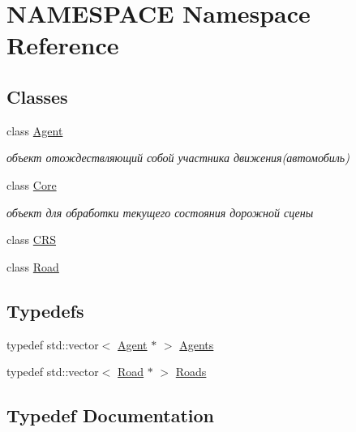 \hypertarget{namespace_n_a_m_e_s_p_a_c_e}{}\section{N\+A\+M\+E\+S\+P\+A\+CE Namespace Reference}
\label{namespace_n_a_m_e_s_p_a_c_e}
\subsection*{Classes}
\begin{DoxyCompactItemize}
\item 
class \hyperlink{class_n_a_m_e_s_p_a_c_e_1_1_agent}{Agent}
\begin{DoxyCompactList}\small\item\em объект отождествляющий собой участника движения(автомобиль) \end{DoxyCompactList}\item 
class \hyperlink{class_n_a_m_e_s_p_a_c_e_1_1_core}{Core}
\begin{DoxyCompactList}\small\item\em объект для обработки текущего состояния дорожной сцены \end{DoxyCompactList}\item 
class \hyperlink{class_n_a_m_e_s_p_a_c_e_1_1_c_r_s}{C\+RS}
\item 
class \hyperlink{class_n_a_m_e_s_p_a_c_e_1_1_road}{Road}
\end{DoxyCompactItemize}
\subsection*{Typedefs}
\begin{DoxyCompactItemize}
\item 
typedef std\+::vector$<$ \hyperlink{class_n_a_m_e_s_p_a_c_e_1_1_agent}{Agent} $\ast$ $>$ \hyperlink{namespace_n_a_m_e_s_p_a_c_e_a610552ba0110b3ee573bc9f3a7a8eac4}{Agents}
\item 
typedef std\+::vector$<$ \hyperlink{class_n_a_m_e_s_p_a_c_e_1_1_road}{Road} $\ast$ $>$ \hyperlink{namespace_n_a_m_e_s_p_a_c_e_a2ec739fb2e81dc98134428bb29817671}{Roads}
\end{DoxyCompactItemize}


\subsection{Typedef Documentation}
\mbox{\label{namespace_n_a_m_e_s_p_a_c_e_a610552ba0110b3ee573bc9f3a7a8eac4}} 
